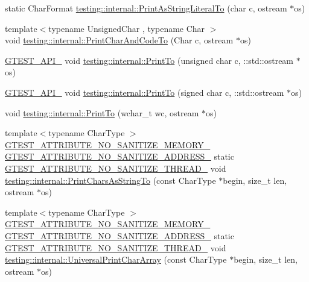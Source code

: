 \begin{DoxyCompactItemize}
static Char\+Format \hyperlink{namespacetesting_1_1internal_a82e5b3cf45fd9c4603dbe14bc4cb38c2}{testing\+::internal\+::\+Print\+As\+String\+Literal\+To} (char c, ostream $\ast$os)
\item 
{\footnotesize template$<$typename Unsigned\+Char , typename Char $>$ }\\void \hyperlink{namespacetesting_1_1internal_a0c577e598e61d339ba45dd6643fb1969}{testing\+::internal\+::\+Print\+Char\+And\+Code\+To} (Char c, ostream $\ast$os)
\item 
\hyperlink{gtest-port_8h_aa73be6f0ba4a7456180a94904ce17790}{G\+T\+E\+S\+T\+\_\+\+A\+P\+I\+\_\+} void \hyperlink{namespacetesting_1_1internal_ab7524d6d3ab8c31b1deea88bf61783bb}{testing\+::internal\+::\+Print\+To} (unsigned char c, \+::std\+::ostream $\ast$os)
\item 
\hyperlink{gtest-port_8h_aa73be6f0ba4a7456180a94904ce17790}{G\+T\+E\+S\+T\+\_\+\+A\+P\+I\+\_\+} void \hyperlink{namespacetesting_1_1internal_ad453af399370e394881079c243abacb4}{testing\+::internal\+::\+Print\+To} (signed char c, \+::std\+::ostream $\ast$os)
\item 
void \hyperlink{namespacetesting_1_1internal_aa74ea9d64f76ce69eceb225ca5ebef58}{testing\+::internal\+::\+Print\+To} (wchar\+\_\+t wc, ostream $\ast$os)
\item 
{\footnotesize template$<$typename Char\+Type $>$ }\\\hyperlink{gtest-port_8h_a2a83dd79037e53814a509cc3f5702650}{G\+T\+E\+S\+T\+\_\+\+A\+T\+T\+R\+I\+B\+U\+T\+E\+\_\+\+N\+O\+\_\+\+S\+A\+N\+I\+T\+I\+Z\+E\+\_\+\+M\+E\+M\+O\+R\+Y\+\_\+} \hyperlink{gtest-port_8h_af18b465f4ba6e36eea7a8d2d79521873}{G\+T\+E\+S\+T\+\_\+\+A\+T\+T\+R\+I\+B\+U\+T\+E\+\_\+\+N\+O\+\_\+\+S\+A\+N\+I\+T\+I\+Z\+E\+\_\+\+A\+D\+D\+R\+E\+S\+S\+\_\+} static \hyperlink{gtest-port_8h_abf30a6b1b3a12ecb2cc1bc1a6f5f9646}{G\+T\+E\+S\+T\+\_\+\+A\+T\+T\+R\+I\+B\+U\+T\+E\+\_\+\+N\+O\+\_\+\+S\+A\+N\+I\+T\+I\+Z\+E\+\_\+\+T\+H\+R\+E\+A\+D\+\_\+} void \hyperlink{namespacetesting_1_1internal_a0be71e6d7cb274131c559193f81c83e2}{testing\+::internal\+::\+Print\+Chars\+As\+String\+To} (const Char\+Type $\ast$begin, size\+\_\+t len, ostream $\ast$os)
\item 
{\footnotesize template$<$typename Char\+Type $>$ }\\\hyperlink{gtest-port_8h_a2a83dd79037e53814a509cc3f5702650}{G\+T\+E\+S\+T\+\_\+\+A\+T\+T\+R\+I\+B\+U\+T\+E\+\_\+\+N\+O\+\_\+\+S\+A\+N\+I\+T\+I\+Z\+E\+\_\+\+M\+E\+M\+O\+R\+Y\+\_\+} \hyperlink{gtest-port_8h_af18b465f4ba6e36eea7a8d2d79521873}{G\+T\+E\+S\+T\+\_\+\+A\+T\+T\+R\+I\+B\+U\+T\+E\+\_\+\+N\+O\+\_\+\+S\+A\+N\+I\+T\+I\+Z\+E\+\_\+\+A\+D\+D\+R\+E\+S\+S\+\_\+} static \hyperlink{gtest-port_8h_abf30a6b1b3a12ecb2cc1bc1a6f5f9646}{G\+T\+E\+S\+T\+\_\+\+A\+T\+T\+R\+I\+B\+U\+T\+E\+\_\+\+N\+O\+\_\+\+S\+A\+N\+I\+T\+I\+Z\+E\+\_\+\+T\+H\+R\+E\+A\+D\+\_\+} void \hyperlink{namespacetesting_1_1internal_ad896a4e4d9133ce43dc18b6038d95dc3}{testing\+::internal\+::\+Universal\+Print\+Char\+Array} (const Char\+Type $\ast$begin, size\+\_\+t len, ostream $\ast$os)

\end{DoxyCompactItemize}
